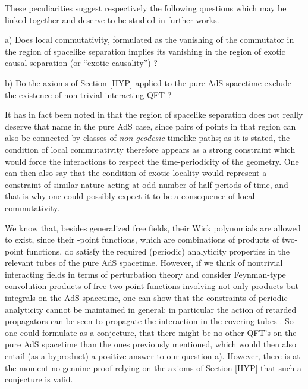 \documentclass[a4paper,a4paper]{article}
\def\wt{\widetilde}
\begin{document}
These peculiarities suggest respectively the following questions
which may be linked together and deserve to be studied in
further works.

a) Does local commutativity, formulated as the vanishing of the
commutator in the region of spacelike separation implies its
vanishing in the region of exotic causal separation (or
``exotic causality'') ?

b) Do the axioms of Section \ref{HYP} applied to the pure AdS
spacetime
exclude the existence of non-trivial interacting QFT ?

It has in fact been noted in \cite{BFS}
that the region of spacelike separation does not
really deserve that name in the pure AdS case, since
pairs of points in that region can also be connected
by classes of {\sl non-geodesic} timelike paths;
as it is stated, the condition of local commutativity therefore
appears as a strong constraint which would force the
interactions to respect the time-periodicity of the geometry.
One can then also say that the condition of exotic locality
would represent a constraint of similar nature acting at
odd number of half-periods of time, and that is why
one could possibly expect it to be a consequence
of local commutativity.

We know that, besides generalized free fields,
their Wick polynomials
are allowed to exist, since their \coordHE{}-point functions,
which are combinations of
products of two-point functions, do satisfy the required
(periodic) analyticity properties in the relevant tubes
\coordHE{}
of the pure AdS spacetime. However, if we think of
nontrivial interacting fields in terms of perturbation theory
and consider Feynman-type convolution products of free two-point
functions involving not only products but integrals on the AdS
spacetime, one can show that the constraints of periodic analyticity
cannot be maintained in general: in particular the action of
retarded propagators can be seen to propagate the interaction
in the covering tubes
\myHighlight{$\wt{\cal T}_{n\pm}$}\coordHE{}.
So one could formulate as a conjecture, that there might be
no other QFT's on the pure AdS spacetime than the ones previously
mentioned, which would then also entail (as a byproduct) a positive
answer to our question a). However, there is at the moment
no genuine proof relying on the axioms of Section \ref{HYP}
that such a conjecture is valid.
\end{document}
